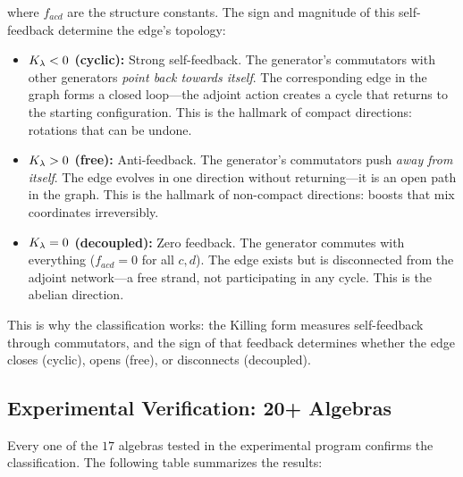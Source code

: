 where $f_{acd}$ are the structure constants. The sign and magnitude of this self-feedback determine the edge's topology:

\begin{itemize}
    \item \textbf{$K_\lambda < 0$ (cyclic):} Strong self-feedback. The generator's commutators with other generators \emph{point back towards itself}. The corresponding edge in the graph forms a closed loop---the adjoint action creates a cycle that returns to the starting configuration. This is the hallmark of compact directions: rotations that can be undone.
    
    \item \textbf{$K_\lambda > 0$ (free):} Anti-feedback. The generator's commutators push \emph{away from itself}. The edge evolves in one direction without returning---it is an open path in the graph. This is the hallmark of non-compact directions: boosts that mix coordinates irreversibly.
    
    \item \textbf{$K_\lambda = 0$ (decoupled):} Zero feedback. The generator commutes with everything ($f_{acd} = 0$ for all $c, d$). The edge exists but is disconnected from the adjoint network---a free strand, not participating in any cycle. This is the abelian direction.
\end{itemize}

This is why the classification works: the Killing form measures self-feedback through commutators, and the sign of that feedback determines whether the edge closes (cyclic), opens (free), or disconnects (decoupled).

\subsection{Experimental Verification: 20+ Algebras}\label{sec:experimental_verification}

Every one of the $17$ algebras tested in the experimental program confirms the classification. The following table summarizes the results:

